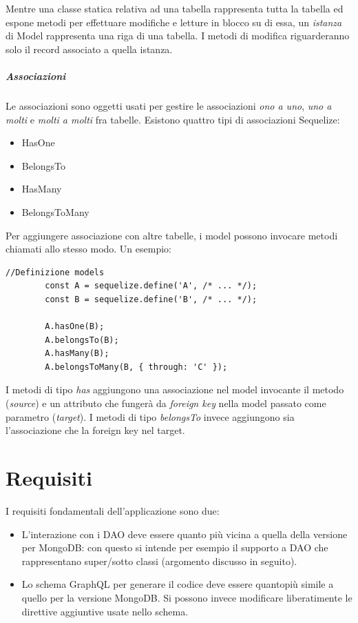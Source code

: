 \documentclass[a4paper, 12pt]{report}
\begin{document}
      Mentre una classe statica relativa ad una tabella rappresenta tutta la tabella ed espone metodi per effettuare modifiche e letture in blocco su di essa, un \emph{istanza} di Model rappresenta una riga di una tabella.
      I metodi di modifica riguarderanno solo il record associato a quella istanza.

      \paragraph*{Associazioni}
      Le associazioni sono oggetti usati per gestire le associazioni \emph{ono a uno}, \emph{uno a molti} e \emph{molti a molti} fra tabelle.
      Esistono quattro tipi di associazioni Sequelize:
      \begin{itemize}
        \item HasOne
        \item BelongsTo
        \item HasMany
        \item BelongsToMany
      \end{itemize}

      Per aggiungere associazione con altre tabelle, i model possono invocare metodi chiamati allo stesso modo. Un esempio:
      \begin{Verbatim}[samepage=true]
        //Definizione models
        const A = sequelize.define('A', /* ... */);
        const B = sequelize.define('B', /* ... */);

        A.hasOne(B);
        A.belongsTo(B);
        A.hasMany(B);
        A.belongsToMany(B, { through: 'C' });
      \end{Verbatim}
       I metodi di tipo \emph{has} aggiungono una associazione nel model invocante il metodo (\emph{source}) e un attributo che fungerà da \emph{foreign key} nella model passato come parametro (\emph{target}).
       I metodi di tipo \emph{belongsTo} invece aggiungono sia l'associazione che la foreign key nel target.

  \newpage
  \chapter{Requisiti}
    I requisiti fondamentali dell'applicazione sono due:
    \begin{itemize}
      \item L'interazione con i DAO deve essere quanto più vicina a quella della versione per MongoDB: con questo si intende per esempio il supporto a DAO che rappresentano super/sotto classi (argomento discusso in seguito).
      \item Lo schema GraphQL per generare il codice deve essere quantopiù simile a quello per la versione MongoDB. Si possono invece modificare liberatimente le direttive aggiuntive usate nello schema.
    \end{itemize}
\end{document}
